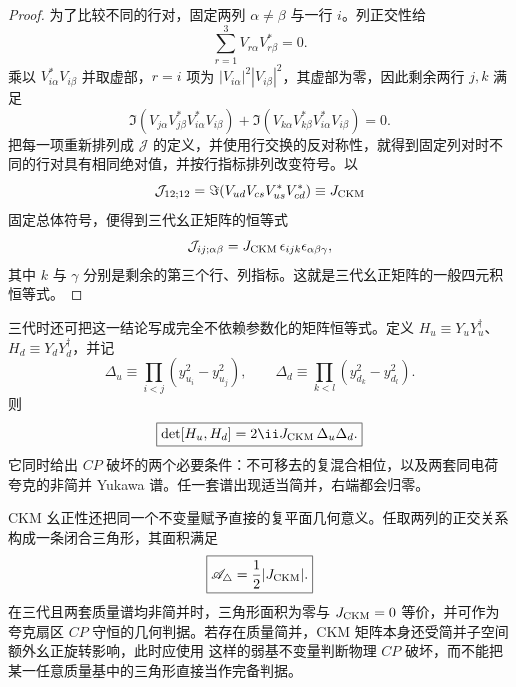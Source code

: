 \begin{proof}
为了比较不同的行对，固定两列 $\alpha\neq\beta$ 与一行 $i$。列正交性给
\begin{equation*}
 \sum_{r=1}^{3}V_{r\alpha}V_{r\beta}^*=0.
\end{equation*}
乘以 $V_{i\alpha}^*V_{i\beta}$ 并取虚部，$r=i$ 项为
$|V_{i\alpha}|^2|V_{i\beta}|^2$，其虚部为零，因此剩余两行 $j,k$ 满足
\begin{equation*}
 \Im\!\left(
 V_{j\alpha}V_{j\beta}^*
 V_{i\alpha}^*V_{i\beta}
 \right)
 +
 \Im\!\left(
 V_{k\alpha}V_{k\beta}^*
 V_{i\alpha}^*V_{i\beta}
 \right)=0.
\end{equation*}
把每一项重新排列成 $\mathcal J$ 的定义，并使用行交换的反对称性，就得到固定列对时不同的行对具有相同绝对值，并按行指标排列改变符号。以
\begin{equation*}
 \mathcal J_{12;12}
 =\Im(V_{ud}V_{cs}V_{us}^*V_{cd}^*)
 \equiv J_{\rm CKM}
\end{equation*}
固定总体符号，便得到三代幺正矩阵的恒等式
\begin{equation*}
 \mathcal J_{ij;\alpha\beta}
 =J_{\rm CKM}\,\epsilon_{ijk}\epsilon_{\alpha\beta\gamma},
\end{equation*}
其中 $k$ 与 $\gamma$ 分别是剩余的第三个行、列指标。这就是三代幺正矩阵的一般四元积恒等式。
\end{proof}


\begin{theorem}[三代弱味的 $CP$ 判据]
三代时还可把这一结论写成完全不依赖参数化的矩阵恒等式。定义 $H_u\equiv Y_uY_u^\dagger$、$H_d\equiv Y_dY_d^\dagger$，并记
\begin{equation*}
 \Delta_u\equiv\prod_{i<j}(y_{u_i}^2-y_{u_j}^2),
 \qquad
 \Delta_d\equiv\prod_{k<l}(y_{d_k}^2-y_{d_l}^2).
\end{equation*}
则
\begin{equation}
 \boxed{\det[H_u,H_d]=2\ii J_{\rm CKM}\,\Delta_u\Delta_d.}
 \label{eq:jarlskog-determinant-dp11}
\end{equation}
它同时给出 $CP$ 破坏的两个必要条件：不可移去的复混合相位，以及两套同电荷夸克的非简并 Yukawa 谱。任一套谱出现适当简并，右端都会归零。

CKM 幺正性还把同一个不变量赋予直接的复平面几何意义。任取两列的正交关系构成一条闭合三角形，其面积满足
\begin{equation}
 \boxed{\mathscr A_\triangle=\frac12|J_{\rm CKM}|.}
 \label{eq:ckm-unitarity-triangle-area-dp41}
\end{equation}
在三代且两套质量谱均非简并时，三角形面积为零与 $J_{\rm CKM}=0$ 等价，并可作为夸克扇区 $CP$ 守恒的几何判据。若存在质量简并，CKM 矩阵本身还受简并子空间额外幺正旋转影响，此时应使用 这样的弱基不变量判断物理 $CP$ 破坏，而不能把某一任意质量基中的三角形直接当作完备判据。

\end{theorem}

